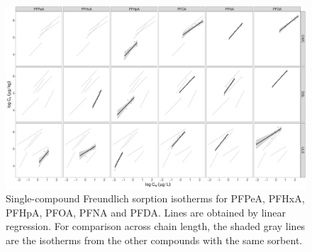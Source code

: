 \begin{landscape}


\begin{figure}[tb]
    \centering
    \includegraphics[height=0.8\textheight]{R/figs/BC_facet_isotherm.pdf}
    \caption{Single-compound Freundlich sorption isotherms for PFPeA, PFHxA, PFHpA, PFOA, PFNA and PFDA. Lines are obtained by linear regression. For comparison across chain length, the shaded gray lines are the isotherms from the other compounds with the same sorbent.}
    \label{fig:sorption_isotherms_all}
\end{figure}

\end{landscape}